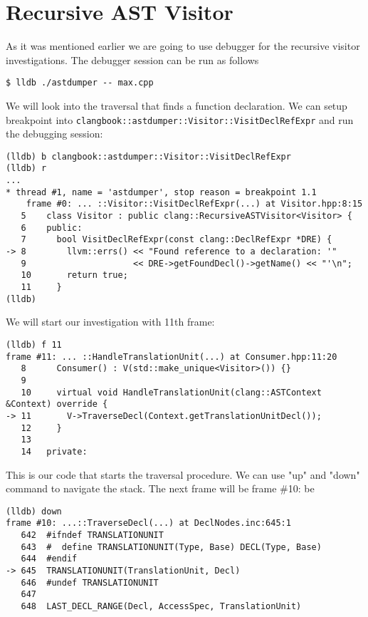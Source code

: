 \section{Recursive AST Visitor}
As it was mentioned earlier we are going to use debugger for the recursive
visitor investigations. The debugger session can be run as follows
\begin{adjustwidth}{0em}{0em}
\begin{verbatim}
$ lldb ./astdumper -- max.cpp
\end{verbatim}
\end{adjustwidth}
We will look into the traversal that finds a function declaration. We can setup
breakpoint into
\texttt{clangbook::astdumper::Visitor::VisitDeclRefExpr} and run the
debugging session:
\begin{adjustwidth}{0em}{0em}
\begin{verbatim}
(lldb) b clangbook::astdumper::Visitor::VisitDeclRefExpr
(lldb) r
...
* thread #1, name = 'astdumper', stop reason = breakpoint 1.1
    frame #0: ... ::Visitor::VisitDeclRefExpr(...) at Visitor.hpp:8:15
   5    class Visitor : public clang::RecursiveASTVisitor<Visitor> {
   6    public:
   7      bool VisitDeclRefExpr(const clang::DeclRefExpr *DRE) {
-> 8        llvm::errs() << "Found reference to a declaration: '"
   9                     << DRE->getFoundDecl()->getName() << "'\n";
   10       return true;
   11     }
(lldb)
\end{verbatim}
\end{adjustwidth}
We will start our investigation with 11th frame:
\begin{adjustwidth}{0em}{0em}
\begin{verbatim}
(lldb) f 11
frame #11: ... ::HandleTranslationUnit(...) at Consumer.hpp:11:20
   8      Consumer() : V(std::make_unique<Visitor>()) {}
   9    
   10     virtual void HandleTranslationUnit(clang::ASTContext &Context) override {
-> 11       V->TraverseDecl(Context.getTranslationUnitDecl());
   12     }
   13   
   14   private:
\end{verbatim}
\end{adjustwidth}
This is our code that starts the traversal procedure. We can use "up" and "down"
command to navigate the stack. The next frame will be frame \#10:
be
\begin{adjustwidth}{0em}{0em}
\begin{verbatim}
(lldb) down
frame #10: ...::TraverseDecl(...) at DeclNodes.inc:645:1
   642  #ifndef TRANSLATIONUNIT
   643  #  define TRANSLATIONUNIT(Type, Base) DECL(Type, Base)
   644  #endif
-> 645  TRANSLATIONUNIT(TranslationUnit, Decl)
   646  #undef TRANSLATIONUNIT
   647  
   648  LAST_DECL_RANGE(Decl, AccessSpec, TranslationUnit)
\end{verbatim}
\end{adjustwidth}
